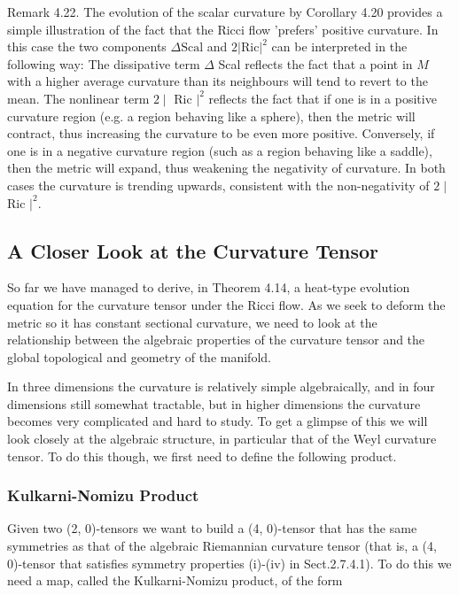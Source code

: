 \documentclass[10pt, letterpaper]{article}
\begin{document}
Remark 4.22. The evolution of the scalar curvature by Corollary 4.20 provides a simple illustration of the fact that the Ricci flow 'prefers' positive curvature. In this case the two components $\Delta \mathrm{Scal}$ and $2|\mathrm{Ric}|^{2}$ can be interpreted in the following way: The dissipative term $\Delta$ Scal reflects the fact that a point in $M$ with a higher average curvature than its neighbours will tend to revert to the mean. The nonlinear term $2 \mid$ Ric $\left.\right|^{2}$ reflects the fact that if one is in a positive curvature region (e.g. a region behaving like a sphere), then the metric will contract, thus increasing the curvature to be even more positive. Conversely, if one is in a negative curvature region (such as a region behaving like a saddle), then the metric will expand, thus weakening the negativity of curvature. In both cases the curvature is trending upwards, consistent with the non-negativity of $2 \mid$ Ric $\left.\right|^{2}$.



\pagebreak




\subsection*{A Closer Look at the Curvature Tensor}
So far we have managed to derive, in Theorem 4.14, a heat-type evolution equation for the curvature tensor under the Ricci flow. As we seek to deform the metric so it has constant sectional curvature, we need to look at the\\
relationship between the algebraic properties of the curvature tensor and the global topological and geometry of the manifold.

In three dimensions the curvature is relatively simple algebraically, and in four dimensions still somewhat tractable, but in higher dimensions the curvature becomes very complicated and hard to study. To get a glimpse of this we will look closely at the algebraic structure, in particular that of the Weyl curvature tensor. To do this though, we first need to define the following product.

\subsubsection*{Kulkarni-Nomizu Product}
Given two (2, 0)-tensors we want to build a (4, 0)-tensor that has the same symmetries as that of the algebraic Riemannian curvature tensor (that is, a (4, 0)-tensor that satisfies symmetry properties (i)-(iv) in Sect.2.7.4.1). To do this we need a map, called the Kulkarni-Nomizu product, of the form
\end{document}
